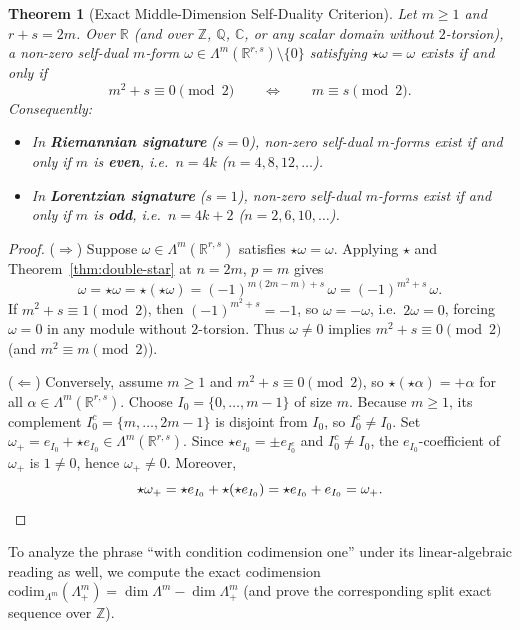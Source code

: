 \documentclass[11pt]{article}
\newtheorem{theorem}{Theorem}[section]
\theoremstyle{definition}
\newcommand{\R}{\mathbb{R}}
\newcommand{\Z}{\mathbb{Z}}
\newcommand{\C}{\mathbb{C}}
\newcommand{\Q}{\mathbb{Q}}
\newcommand{\codim}{\mathrm{codim}}
\begin{document}
\begin{theorem}[Exact Middle-Dimension Self-Duality Criterion]\label{thm:self-dual-iff}
Let $m \ge 1$ and $r + s = 2m$. Over $\R$ (and over $\Z$, $\Q$, $\C$, or any scalar domain without $2$-torsion), a non-zero self-dual $m$-form $\omega \in \Lambda^m(\R^{r,s}) \setminus \{0\}$ satisfying $\star\omega = \omega$ exists if and only if
\begin{equation}\label{eq:sd-parity}
  m^2 + s \equiv 0 \pmod{2} \qquad \Longleftrightarrow \qquad m \equiv s \pmod{2}.
\end{equation}
Consequently:
\begin{itemize}
  \item[(a)] In \textbf{Riemannian signature} ($s = 0$), non-zero self-dual $m$-forms exist if and only if $m$ is \textbf{even}, i.e.\ $n = 4k$ ($n = 4, 8, 12, \dots$).
  \item[(b)] In \textbf{Lorentzian signature} ($s = 1$), non-zero self-dual $m$-forms exist if and only if $m$ is \textbf{odd}, i.e.\ $n = 4k + 2$ ($n = 2, 6, 10, \dots$).
\end{itemize}
\end{theorem}

\begin{proof}
($\Rightarrow$) Suppose $\omega \in \Lambda^m(\R^{r,s})$ satisfies $\star\omega = \omega$. Applying $\star$ and Theorem~\ref{thm:double-star} at $n = 2m$, $p = m$ gives
\[
  \omega = \star\omega = \star(\star\omega) = (-1)^{m(2m-m)+s}\,\omega = (-1)^{m^2+s}\,\omega.
\]
If $m^2 + s \equiv 1 \pmod 2$, then $(-1)^{m^2+s} = -1$, so $\omega = -\omega$, i.e.\ $2\omega = 0$, forcing $\omega = 0$ in any module without $2$-torsion. Thus $\omega \neq 0$ implies $m^2 + s \equiv 0 \pmod 2$ (and $m^2 \equiv m \pmod 2$).

($\Leftarrow$) Conversely, assume $m \ge 1$ and $m^2 + s \equiv 0 \pmod 2$, so $\star(\star\alpha) = +\alpha$ for all $\alpha \in \Lambda^m(\R^{r,s})$. Choose $I_0 = \{0, \dots, m-1\}$ of size $m$. Because $m \ge 1$, its complement $I_0^c = \{m, \dots, 2m-1\}$ is disjoint from $I_0$, so $I_0^c \neq I_0$. Set $\omega_+ = e_{I_0} + \star e_{I_0} \in \Lambda^m(\R^{r,s})$. Since $\star e_{I_0} = \pm e_{I_0^c}$ and $I_0^c \neq I_0$, the $e_{I_0}$-coefficient of $\omega_+$ is $1 \neq 0$, hence $\omega_+ \neq 0$. Moreover,
\[
  \star\omega_+ = \star e_{I_0} + \star(\star e_{I_0}) = \star e_{I_0} + e_{I_0} = \omega_+. \qedhere
\]
\end{proof}

To analyze the phrase ``with condition codimension one'' under its linear-algebraic reading as well, we compute the exact codimension $\codim_{\Lambda^m}(\Lambda^m_+) = \dim\Lambda^m - \dim\Lambda^m_+$ (and prove the corresponding split exact sequence over $\Z$).
\end{document}

